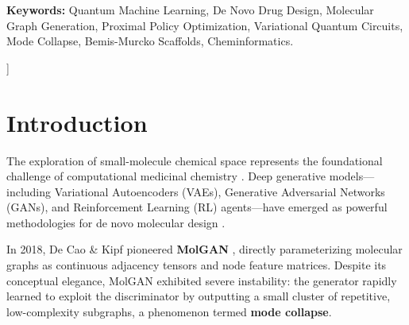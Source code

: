 \documentclass[10pt,twocolumn,a4paper]{article}
\begin{document}
\begin{@twocolumnfalse}
\begin{abstract}
    Trained on the QM9 chemical benchmark, MolGAN-QPolicy completely eliminates the classic validity/uniqueness trade-off: attaining \textbf{99.47\% validity}, \textbf{99.27\% stability}, and preserving \textbf{62.37\% uniqueness at Epoch 50} (peaking at \textbf{88.24\%}), representing an $8\times$ to $240\times$ increase over existing quantum-enhanced baselines. On the standardized benchmark ($N = 497$), our model achieves an NVU (Number of Valid and Unique molecules) of \textbf{288 (mean) / 447 (peak)} compared to MolGAN-QRL's \textbf{29} and QGAN-HG's \textbf{31}---a $10\times$ to $15\times$ improvement. Comprehensive 3-tier cheminformatics screening demonstrates that \textbf{89.0\%} of generated unique structures are readily preparable bench compounds with standard synthetic accessibility ($\text{Raw SAS} \le 5.0$), verified 3D Euclidean embeddability, and zero ring/allene strain alerts.
    \end{abstract}
    
    \vspace{0.8em}
    \noindent\textbf{\small Keywords:} Quantum Machine Learning, De Novo Drug Design, Molecular Graph Generation, Proximal Policy Optimization, Variational Quantum Circuits, Mode Collapse, Bemis-Murcko Scaffolds, Cheminformatics.
    \vspace{1.5em}
  \end{@twocolumnfalse}
]

\section{Introduction}
The exploration of small-molecule chemical space represents the foundational challenge of computational medicinal chemistry \cite{bickerton2012}. Deep generative models---including Variational Autoencoders (VAEs), Generative Adversarial Networks (GANs), and Reinforcement Learning (RL) agents---have emerged as powerful methodologies for de novo molecular design \cite{olivecrona2017}. 

In 2018, De Cao \& Kipf pioneered \textbf{MolGAN} \cite{decao2018}, directly parameterizing molecular graphs as continuous adjacency tensors and node feature matrices. Despite its conceptual elegance, MolGAN exhibited severe instability: the generator rapidly learned to exploit the discriminator by outputting a small cluster of repetitive, low-complexity subgraphs, a phenomenon termed \textbf{mode collapse}. 
\end{document}

